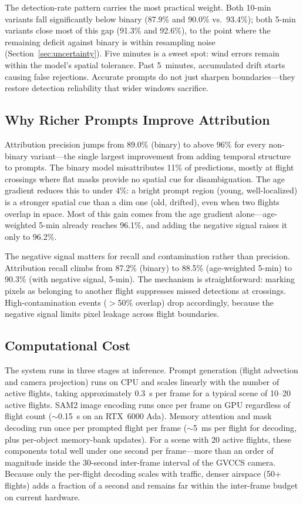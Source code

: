 \documentclass[1p,11pt]{elsarticle}
\begin{document}
The detection-rate pattern carries the most practical weight. Both 10-min variants fall significantly below binary (87.9\% and 90.0\% vs.\ 93.4\%); both 5-min variants close most of this gap (91.3\% and 92.6\%), to the point where the remaining deficit against binary is within resampling noise (Section~\ref{sec:uncertainty}). Five minutes is a sweet spot: wind errors remain within the model's spatial tolerance. Past 5~minutes, accumulated drift starts causing false rejections. Accurate prompts do not just sharpen boundaries---they restore detection reliability that wider windows sacrifice.

\subsection{Why Richer Prompts Improve Attribution}

Attribution precision jumps from 89.0\% (binary) to above 96\% for every non-binary variant---the single largest improvement from adding temporal structure to prompts. The binary model misattributes 11\% of predictions, mostly at flight crossings where flat masks provide no spatial cue for disambiguation. The age gradient reduces this to under 4\%: a bright prompt region (young, well-localized) is a stronger spatial cue than a dim one (old, drifted), even when two flights overlap in space. Most of this gain comes from the age gradient alone---age-weighted 5-min already reaches 96.1\%, and adding the negative signal raises it only to 96.2\%.

The negative signal matters for recall and contamination rather than precision. Attribution recall climbs from 87.2\% (binary) to 88.5\% (age-weighted 5-min) to 90.3\% (with negative signal, 5-min). The mechanism is straightforward: marking pixels as belonging to another flight suppresses missed detections at crossings. High-contamination events ($>$50\% overlap) drop accordingly, because the negative signal limits pixel leakage across flight boundaries.

\subsection{Computational Cost}

The system runs in three stages at inference. Prompt generation (flight advection and camera projection) runs on CPU and scales linearly with the number of active flights, taking approximately 0.3~s per frame for a typical scene of 10--20 active flights. SAM2 image encoding runs once per frame on GPU regardless of flight count ($\sim$0.15~s on an RTX~6000 Ada). Memory attention and mask decoding run once per prompted flight per frame ($\sim$5~ms per flight for decoding, plus per-object memory-bank updates). For a scene with 20 active flights, these components total well under one second per frame---more than an order of magnitude inside the 30-second inter-frame interval of the GVCCS camera. Because only the per-flight decoding scales with traffic, denser airspace (50+ flights) adds a fraction of a second and remains far within the inter-frame budget on current hardware.
\end{document}
